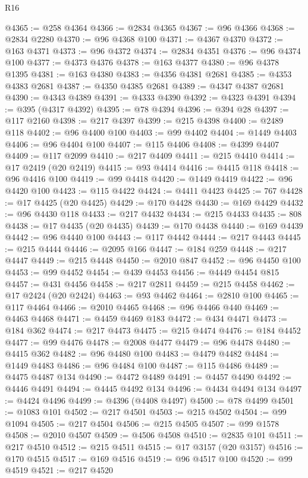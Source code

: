 \begin{lexlean}{R16}
\begin{coremodule}
@4365 := @258 @4364
@4366 := @2834 @4365
@4367 := @96 @4366
@4368 := @2834 @2280
@4370 := @96 @4368 @100
@4371 := @4367 @4370
@4372 := @163 @4371
@4373 := @96 @4372
@4374 := @2834 @4351
@4376 := @96 @4374 @100
@4377 := @4373 @4376
@4378 := @163 @4377
@4380 := @96 @4378 @1395
@4381 := @163 @4380
@4383 := @4356 @4381 @2681
@4385 := @4353 @4383 @2681
@4387 := @4350 @4385 @2681
@4389 := @4347 @4387 @2681
@4390 := @4343 @4389
@4391 := @4333 @4390
@4392 := @4323 @4391
@4394 := @395 (@4317 @4392)
@4395 := @78 @4394
@4396 := @394 @28
@4397 := @117 @2160
@4398 := @217 @4397
@4399 := @215 @4398
@4400 := @2489 @118
@4402 := @96 @4400 @100
@4403 := @99 @4402
@4404 := @1449 @4403
@4406 := @96 @4404 @100
@4407 := @115 @4406
@4408 := @4399 @4407
@4409 := @117 @2099
@4410 := @217 @4409
@4411 := @215 @4410
@4414 := @17 @2419 (@20 @2419)
@4415 := @93 @4414
@4416 := @4415 @118
@4418 := @96 @4416 @100
@4419 := @99 @4418
@4420 := @1449 @4419
@4422 := @96 @4420 @100
@4423 := @115 @4422
@4424 := @4411 @4423
@4425 := 767
@4428 := @17 @4425 (@20 @4425)
@4429 := @170 @4428
@4430 := @169 @4429
@4432 := @96 @4430 @118
@4433 := @217 @4432
@4434 := @215 @4433
@4435 := 808
@4438 := @17 @4435 (@20 @4435)
@4439 := @170 @4438
@4440 := @169 @4439
@4442 := @96 @4440 @100
@4443 := @117 @4442
@4444 := @217 @4443
@4445 := @215 @4444
@4446 := @2095 @166
@4447 := @184 @259
@4448 := @217 @4447
@4449 := @215 @4448
@4450 := @2010 @847
@4452 := @96 @4450 @100
@4453 := @99 @4452
@4454 := @439 @4453
@4456 := @4449 @4454 @815
@4457 := @431 @4456
@4458 := @217 @2811
@4459 := @215 @4458
@4462 := @17 @2424 (@20 @2424)
@4463 := @93 @4462
@4464 := @2810 @100
@4465 := @117 @4464
@4466 := @2010 @4465
@4468 := @96 @4466 @440
@4469 := @4463 @4468
@4471 := @4459 @4469 @183
@4472 := @434 @4471
@4473 := @184 @362
@4474 := @217 @4473
@4475 := @215 @4474
@4476 := @184 @4452
@4477 := @99 @4476
@4478 := @2008 @4477
@4479 := @96 @4478
@4480 := @4415 @362
@4482 := @96 @4480 @100
@4483 := @4479 @4482
@4484 := @1449 @4483
@4486 := @96 @4484 @100
@4487 := @115 @4486
@4489 := @4475 @4487 @134
@4490 := @4472 @4489
@4491 := @4457 @4490
@4492 := @4446 @4491
@4494 := @4445 @4492 @134
@4496 := @4434 @4494 @134
@4497 := @4424 @4496
@4499 := @4396 (@4408 @4497)
@4500 := @78 @4499
@4501 := @1083 @101
@4502 := @217 @4501
@4503 := @215 @4502
@4504 := @99 @1094
@4505 := @217 @4504
@4506 := @215 @4505
@4507 := @99 @1578
@4508 := @2010 @4507
@4509 := @4506 @4508
@4510 := @2835 @101
@4511 := @217 @4510
@4512 := @215 @4511
@4515 := @17 @3157 (@20 @3157)
@4516 := @170 @4515
@4517 := @169 @4516
@4519 := @96 @4517 @100
@4520 := @99 @4519
@4521 := @217 @4520

\end{coremodule}
\end{lexlean}

